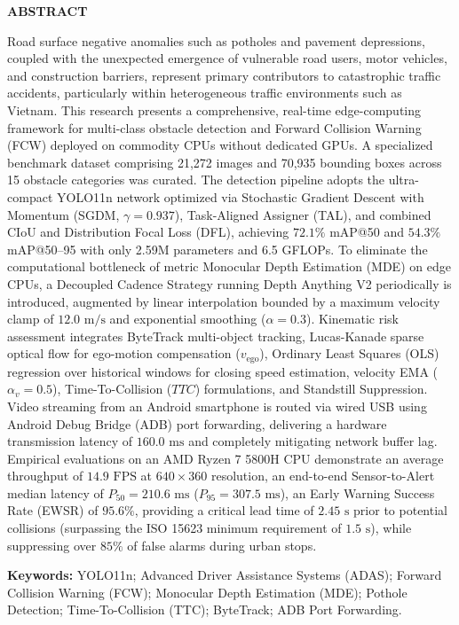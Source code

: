 \documentclass[12pt,a4paper]{article}
\begin{document}
\vspace{1cm}
\begin{center}
    \large\textbf{ABSTRACT}
\end{center}
\noindent Road surface negative anomalies such as potholes and pavement depressions, coupled with the unexpected emergence of vulnerable road users, motor vehicles, and construction barriers, represent primary contributors to catastrophic traffic accidents, particularly within heterogeneous traffic environments such as Vietnam. This research presents a comprehensive, real-time edge-computing framework for multi-class obstacle detection and Forward Collision Warning (FCW) deployed on commodity CPUs without dedicated GPUs. A specialized benchmark dataset comprising 21,272 images and 70,935 bounding boxes across 15 obstacle categories was curated. The detection pipeline adopts the ultra-compact YOLO11n network optimized via Stochastic Gradient Descent with Momentum (SGDM, $\gamma = 0.937$), Task-Aligned Assigner (TAL), and combined CIoU and Distribution Focal Loss (DFL), achieving $72.1\%$ mAP@50 and $54.3\%$ mAP@50--95 with only 2.59M parameters and 6.5 GFLOPs. To eliminate the computational bottleneck of metric Monocular Depth Estimation (MDE) on edge CPUs, a Decoupled Cadence Strategy running Depth Anything V2 periodically is introduced, augmented by linear interpolation bounded by a maximum velocity clamp of $12.0\text{ m/s}$ and exponential smoothing ($\alpha = 0.3$). Kinematic risk assessment integrates ByteTrack multi-object tracking, Lucas-Kanade sparse optical flow for ego-motion compensation ($v_{\text{ego}}$), Ordinary Least Squares (OLS) regression over historical windows for closing speed estimation, velocity EMA ($\alpha_v = 0.5$), Time-To-Collision ($TTC$) formulations, and Standstill Suppression. Video streaming from an Android smartphone is routed via wired USB using Android Debug Bridge (ADB) port forwarding, delivering a hardware transmission latency of $160.0\text{ ms}$ and completely mitigating network buffer lag. Empirical evaluations on an AMD Ryzen 7 5800H CPU demonstrate an average throughput of $14.9\text{ FPS}$ at $640 \times 360$ resolution, an end-to-end Sensor-to-Alert median latency of $P_{50} = 210.6\text{ ms}$ ($P_{95} = 307.5\text{ ms}$), an Early Warning Success Rate (EWSR) of $95.6\%$, providing a critical lead time of $2.45\text{ s}$ prior to potential collisions (surpassing the ISO 15623 minimum requirement of $1.5\text{ s}$), while suppressing over $85\%$ of false alarms during urban stops.

\vspace{0.5cm}
\noindent\textbf{Keywords:} YOLO11n; Advanced Driver Assistance Systems (ADAS); Forward Collision Warning (FCW); Monocular Depth Estimation (MDE); Pothole Detection; Time-To-Collision (TTC); ByteTrack; ADB Port Forwarding.
\end{document}
